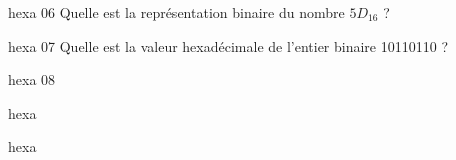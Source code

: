 {\begin{question}{hexa 06}%
	Quelle est la représentation binaire du nombre $5D_{16}$ ?
	\begin{multicols}{4}
	\begin{reponses}	
	\end{reponses}
	\end{multicols}
\end{question}

\begin{question}{hexa 07}%
	Quelle est la valeur hexadécimale de l'entier binaire 10110110 ?
	\begin{multicols}{4}
	\begin{reponses}
	\bonne{B6}
	\mauvaise{C4}
	\mauvaise{B8}
	\mauvaise{C6}
	\end{reponses}
	\end{multicols}
\end{question}

\begin{question}{hexa 08}%
	\begin{multicols}{4}
	\begin{reponses}	
	\bonne{}
	\mauvaise{}
	\mauvaise{}
	\mauvaise{}
	\end{reponses}
	\end{multicols}
\end{question}

\begin{question}{hexa }%
	\begin{multicols}{4}
	\begin{reponses}	
	\bonne{}
	\mauvaise{}
	\mauvaise{}
	\mauvaise{}
	\end{reponses}
	\end{multicols}
\end{question}

\begin{question}{hexa }%
	\begin{multicols}{4}
	\begin{reponses}	
	\bonne{}
	\mauvaise{}
	\mauvaise{}
	\mauvaise{}
	\end{reponses}
	\end{multicols}
\end{question}
}
